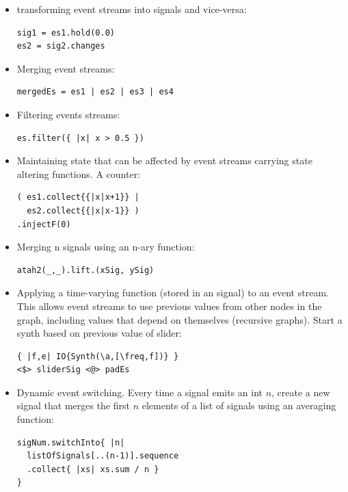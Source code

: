 \documentclass{article}
\begin{document}
\begin{itemize}\itemsep0em
\item transforming event streams into signals and vice-versa:\\
\begin{Verbatim}
sig1 = es1.hold(0.0)
es2 = sig2.changes
\end{Verbatim}
\item Merging event streams:\\
\begin{Verbatim}
mergedEs = es1 | es2 | es3 | es4
\end{Verbatim}
\item Filtering events streams:\\
\begin{Verbatim}
es.filter({ |x| x > 0.5 })
\end{Verbatim}
\item Maintaining state that can be affected by event streams carrying state altering functions. A counter:\\
\begin{Verbatim}
( es1.collect{{|x|x+1}} | 
  es2.collect{{|x|x-1}} )
.injectF(0) 
\end{Verbatim}
\item Merging n signals using an n-ary function:\\
\begin{Verbatim}
atah2(_,_).lift.(xSig, ySig)
\end{Verbatim}
\item Applying a time-varying function (stored in an signal) to an event stream. This allows event streams to use previous values from other nodes in the graph, including values that depend on themselves (recursive graphs). Start a synth based on previous value of slider:\\
\begin{Verbatim}
{ |f,e| IO{Synth(\a,[\freq,f])} }
<$> sliderSig <@> padEs 
\end{Verbatim}
\item Dynamic event switching. Every time a signal emits an int $n$, create a new signal that merges the first $n$ elements of a list of signals using an averaging function:\\
\begin{Verbatim}
sigNum.switchInto{ |n|
  listOfSignals[..(n-1)].sequence
  .collect{ |xs| xs.sum / n }
}
\end{Verbatim}
\end{itemize}
\end{document}
